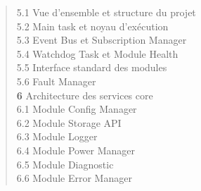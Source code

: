 \begin{quote}
\hspace{2.5em} 5.1 \hspace{0.5em} Vue d'ensemble et structure du projet \dotfill \pageref{subsec:vue_ensemble}\\
\hspace{2.5em} 5.2 \hspace{0.5em} Main task et noyau d'exécution \dotfill \pageref{subsec:main_task}\\
\hspace{2.5em}5.3 \hspace{0.5em} Event Bus et Subscription Manager \dotfill \pageref{subsec:event_bus}\\
\hspace{2.5em} 5.4 \hspace{0.5em} Watchdog Task et Module Health \dotfill \pageref{subsec:timers}\\
\hspace{2.5em} 5.5 \hspace{0.5em} Interface standard des modules \dotfill \pageref{subsec:module_iface}\\
\hspace{2.5em} 5.6 \hspace{0.5em} Fault Manager \dotfill \pageref{subsec:inter_modules}\\
\textbf{6} \hspace{1em} Architecture des services core \dotfill \pageref{sec:services_core}\\
\hspace{2.5em} 6.1 \hspace{0.5em} Module Config Manager \dotfill \pageref{subsec:mod_config}\\
\hspace{2.5em} 6.2 \hspace{0.5em} Module Storage API \dotfill \pageref{subsec:mod_storage}\\
\hspace{2.5em} 6.3 \hspace{0.5em} Module Logger \dotfill \pageref{subsec:mod_logger}\\
\hspace{2.5em} 6.4 \hspace{0.5em} Module Power Manager \dotfill \pageref{subsec:mod_power}\\
\hspace{2.5em} 6.5 \hspace{0.5em} Module Diagnostic \dotfill \pageref{subsec:mod_diag}\\
\hspace{2.5em} 6.6 \hspace{0.5em} Module Error Manager \dotfill \pageref{subsec:mod_error}\\

\end{quote}
